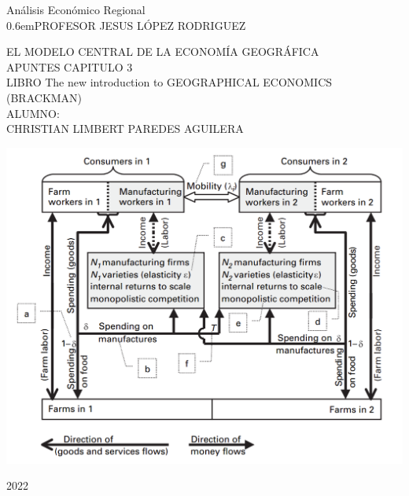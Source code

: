 \begin{titlingpage}

\newcommand\nbvspace[1][3]{\vspace*{\stretch{#1}}}
\newcommand\nbstretchyspace{\spaceskip0.5em plus 0.25em minus 0.25em}
\newcommand{\nbtitlestretch}{\spaceskip0.6em}
\pagestyle{empty}

\begin{center}
\bfseries
\nbvspace[1]

\Large Análisis Económico Regional\\
\Huge
{\nbtitlestretch\Huge PROFESOR JESUS LÓPEZ RODRIGUEZ}\\
\vspace{.5cm}
\large
\nbvspace[1]

EL MODELO CENTRAL DE LA ECONOMÍA GEOGRÁFICA\\

APUNTES CAPITULO 3\\
LIBRO The new introduction to GEOGRAPHICAL ECONOMICS (BRACKMAN)\\


\nbvspace[1]
\small ALUMNO:\\

\footnotesize CHRISTIAN LIMBERT PAREDES AGUILERA\\

\nbvspace[2]

\begin{center}
\includegraphics[scale=.3]{./imagen/diag.png}
\end{center}

\nbvspace[3]
\normalsize

2022
\large
\nbvspace[1]

\end{center}

\break
\bfseries 

\end{titlingpage}



\tableofcontents								%

\pagestyle{fancy}
\fancyhead[LE,RO]{\nouppercase{\truncate{0.5\headwidth}{\rightmark}}}
\fancyhead[LO,RE]{\nouppercase{\truncate{0.5\headwidth}{\leftmark}}}

\let\cleardoublepage\clearpage
